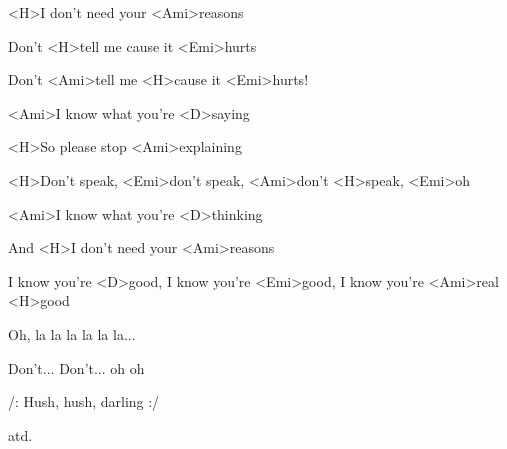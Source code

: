 <H>I don't need your <Ami>reasons

Don't <H>tell me cause it <Emi>hurts

Don't <Ami>tell me <H>cause it <Emi>hurts!

<Ami>I know what you're <D>saying

<H>So please stop <Ami>explaining

<H>Don't speak, <Emi>don't speak, <Ami>don't <H>speak, <Emi>oh

<Ami>I know what you're <D>thinking

And <H>I don't need your <Ami>reasons

I know you're <D>good, I know you're <Emi>good, I know you're <Ami>real <H>good

Oh, la la la la la la...

Don't... Don't... oh oh

/: Hush, hush, darling :/

atd.
\kr

\kp
